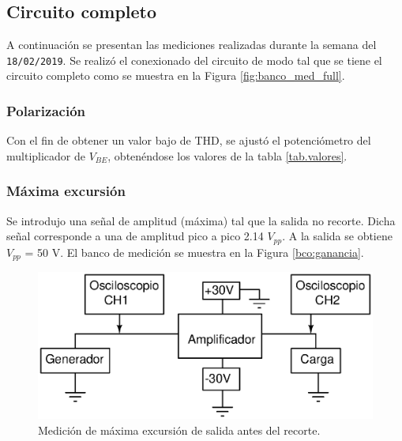 
		\subsection{Circuito completo}
		A continuación se presentan las mediciones realizadas durante la semana del \texttt{18/02/2019}. Se realizó el conexionado del circuito de modo tal que se tiene el circuito completo como se muestra en la Figura \ref{fig:banco_med_full}. 



		\subsubsection{Polarización}
			Con el fin de obtener un valor bajo de THD, se ajustó el potenciómetro del multiplicador de $V_{BE}$, obtenéndose los valores de la tabla \ref{tab.valores}.

		\subsubsection{Máxima excursión}
		Se introdujo una señal de amplitud (máxima) tal que la salida no recorte. Dicha señal corresponde a una
		de amplitud pico a pico 2.14 $V_{pp}$. A la salida se obtiene $V_{pp}$ = 50 V. El banco de medición se muestra en la Figura \ref{bco:ganancia}.

		\begin{figure}[h!]
			\centering
			\includegraphics[scale=0.5]{Figuras/bco_ganancia.eps}
			\caption{Medición de máxima excursión de salida antes del recorte.}
			\label{fig:bco_ganancia}
		\end{figure}

